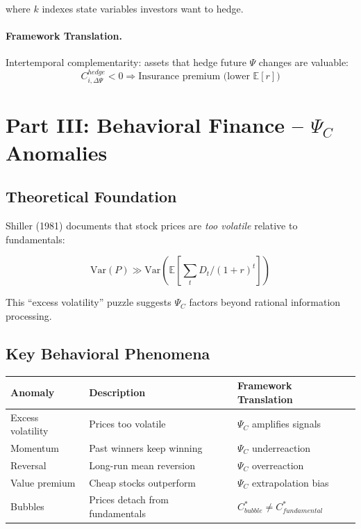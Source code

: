 where $k$ indexes state variables investors want to hedge.

\paragraph{Framework Translation.}
Intertemporal complementarity: assets that hedge future $\Psi$ changes are valuable:
\begin{equation}
C_{i, \Delta\Psi}^{hedge} < 0 \Rightarrow \text{Insurance premium (lower } \mathbb{E}[r])
\end{equation}


\section{Part III: Behavioral Finance -- $\Psi_C$ Anomalies}
\label{sec:Y-behavioral}

\subsection{Theoretical Foundation}

Shiller (1981) documents that stock prices are \textit{too volatile} relative
to fundamentals:

\begin{equation}
\boxed{
\text{Var}(P) \gg \text{Var}(\mathbb{E}[\sum_t D_t / (1+r)^t])
}
\label{eq:excess-volatility}
\end{equation}

This ``excess volatility'' puzzle suggests $\Psi_C$ factors beyond rational
information processing.

\subsection{Key Behavioral Phenomena}

\begin{center}
\renewcommand{\arraystretch}{1.3}
\begin{tabular}{|l|l|l|}
\hline
\textbf{Anomaly} & \textbf{Description} & \textbf{Framework Translation} \\
\hline
Excess volatility & Prices too volatile & $\Psi_C$ amplifies signals \\
Momentum & Past winners keep winning & $\Psi_C$ underreaction \\
Reversal & Long-run mean reversion & $\Psi_C$ overreaction \\
Value premium & Cheap stocks outperform & $\Psi_C$ extrapolation bias \\
Bubbles & Prices detach from fundamentals & $C^*_{bubble} \neq C^*_{fundamental}$ \\
\hline
\end{tabular}
\end{center}

